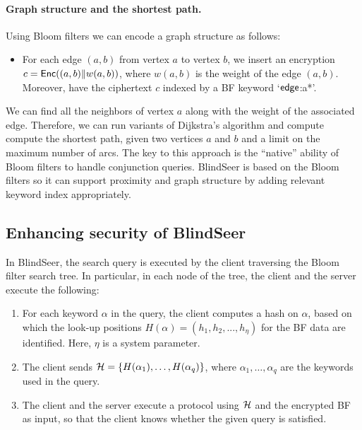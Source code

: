 \paragraph{Graph structure and the shortest path.}
Using Bloom filters we can encode a graph structure as follows:
\begin{itemize}
\item For each edge $(a, b)$ from vertex $a$ to vertex $b$, we insert an
  encryption $c = \mathsf{Enc}((a,b) \| w(a,b) )$, where $w(a,b)$ is the weight of the edge
    $(a,b)$. Moreover, have the ciphertext $c$ indexed by a BF keyword `$\sf edge$:a*'. 
\end{itemize}

\noindent
We can find all the neighbors of vertex $a$ along with the weight of the
associated edge. Therefore, we can run variants of Dijkstra's algorithm and
compute compute the shortest path, given two vertices $a$ and $b$ and a limit
on the maximum number of arcs. The key to this approach is the ``native''
ability of Bloom filters to handle conjunction queries.  BlindSeer is based on
the Bloom filters so it can support proximity and graph structure by adding
relevant keyword index appropriately.
%


\def\HHH{{\cal H}}
\subsection{Enhancing security of BlindSeer}

In BlindSeer, the search query is executed by the client traversing the Bloom filter
search tree. In particular, in each node of the tree, the client and the server
execute the following:
\begin{enumerate}\setlength\itemsep{0em}
\item For each keyword $\alpha$ in the query, the client computes a hash on
$\alpha$, based on which the look-up positions $H(\alpha) =  (h_1, h_2, ...,
h_\eta)$ for the BF data are identified. Here, $\eta$ is a system
parameter. 

\item The client sends $\HHH = \{H(\alpha_1), \ldots, H(\alpha_q)\}$,
  where $\alpha_1,\ldots,\alpha_q$ are the keywords used in the query.

\item The client and the server execute a protocol using $\HHH$ and the
encrypted BF as input, so that the client knows whether the given query is
satisfied. 
\end{enumerate}

